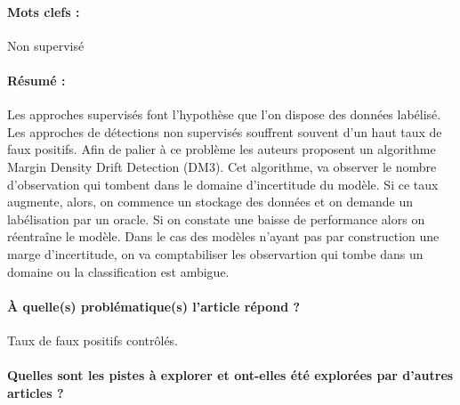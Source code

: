 \documentclass[11pt,a4paper]{report}
\begin{document}
\paragraph{Mots clefs :} Non supervisé

\paragraph{Résumé :} Les approches supervisés font l'hypothèse que l'on dispose des données labélisé. Les approches de détections non supervisés souffrent souvent d'un haut taux de faux positifs. Afin de palier à ce problème les auteurs proposent un algorithme Margin Density Drift Detection (DM3). Cet algorithme, va observer le nombre d'observation qui tombent dans le domaine d'incertitude du modèle. Si ce taux augmente, alors, on commence un stockage des données et on demande un labélisation par un oracle. Si on constate une baisse de performance alors on réentraîne le modèle. Dans le cas des modèles n'ayant pas par construction une marge d'incertitude, on va comptabiliser les observartion qui tombe dans un domaine ou la classification est ambigue.

\paragraph{À quelle(s) problématique(s) l'article répond ?} Taux de faux positifs contrôlés.

\paragraph{Quelles sont les pistes à explorer et ont-elles  été explorées par d'autres articles ?}










\end{document}
